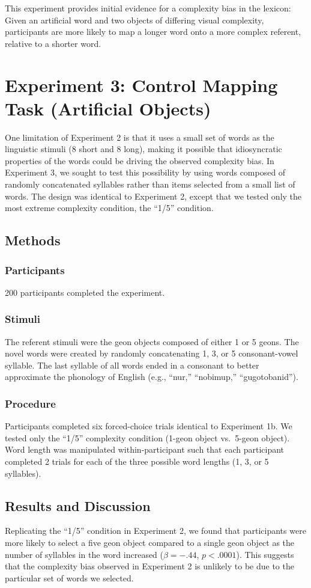 \documentclass[man]{apa2}
\begin{document}
This experiment provides initial evidence for a complexity bias in the lexicon: Given an artificial word and two objects of differing visual complexity, participants are more likely to map a longer word onto a more complex referent, relative to a shorter word.

				
\section{Experiment 3: Control Mapping Task (Artificial Objects)}
One limitation of Experiment 2 is that it uses a small set of words as the linguistic stimuli (8 short and 8 long), making it possible that idiosyncratic properties of the words could be driving the observed complexity bias. In Experiment 3, we sought to test this possibility by using words composed of randomly concatenated syllables rather than items selected from a small list of words. The design was identical to Experiment 2, except that we tested only the most extreme complexity condition, the ``1/5'' condition.

\subsection{Methods}
\subsubsection{Participants} 200 participants completed the experiment.
\subsubsection{Stimuli} The referent stimuli were the geon objects composed of either 1 or 5 geons. The novel words were created by randomly concatenating 1, 3, or 5 consonant-vowel syllable. The last syllable of all words ended in a consonant to better approximate the phonology of English (e.g., ``nur,'' ``nobimup,'' ``gugotobanid'').

\subsubsection{Procedure}
Participants completed six forced-choice trials identical to Experiment 1b. We tested only the ``1/5'' complexity condition (1-geon object vs.\ 5-geon object). Word length was manipulated within-participant such that each participant completed 2 trials for each of the three possible word lengths (1, 3, or 5 syllables).

\subsection{Results and Discussion}
Replicating the ``1/5'' condition in Experiment 2, we found that participants were more likely to select a five geon object compared to a single geon object as the number of syllables in the word increased ($\beta=-.44$, $p <.0001$). This suggests that the complexity bias observed in Experiment 2 is unlikely to be due to the particular set of words we selected.
\end{document}
